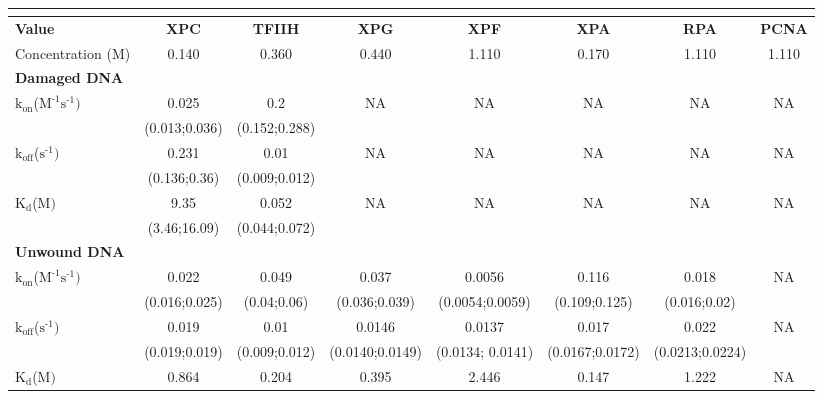 \begin{table}[H]
	
	\tiny
	\begin{tabular}{lccccccc}
		
		\multicolumn{8}{l}{} \\
		\hline
		\textbf{Value}    & \textbf{ XPC} & \textbf{TFIIH} & \textbf{XPG} & \textbf{XPF} & \textbf{XPA} & \textbf{RPA} & \textbf{PCNA}  \\
		\hline
		Concentration ({\textmu}M)                                                                        &0.140    & 0.360 & 0.440& 1.110& 0.170& 1.110& 1.110     \\
		\multicolumn{8}{l}{\textbf{Damaged DNA}} \\
		$\text{k}_{\text{on}}$({\textmu}$\text{M}^{\text{-1}}\text{s}^{\text{-1}})$& 0.025               & 0.2  & NA &NA&NA&NA&NA     \\
		& (0.013;0.036)     & (0.152;0.288)  &&&&&   \\
		$\text{k}_{\text{off}}$($\text{s}^{\text{-1}})$                                             & 0.231                & 0.01 & NA &NA&NA&NA&NA     \\
		& (0.136;0.36)     &(0.009;0.012)  &&&&&   \\
		$\text{K}_{\text{d}}$({\textmu}$\text{M})$                                                  & 9.35                & 0.052  & NA &NA&NA&NA&NA     \\
		& (3.46;16.09)     &(0.044;0.072)  &&&&&   \\
		\multicolumn{8}{l}{\textbf{Unwound DNA}} \\
		$\text{k}_{\text{on}}$({\textmu}$\text{M}^{\text{-1}}\text{s}^{\text{-1}})$    & 0.022                     & 0.049                   & 0.037                 &  0.0056             & 0.116                   &0.018                    & NA    \\
		& (0.016;0.025)     & (0.04;0.06)   					&(0.036;0.039) 		 & (0.0054;0.0059)&(0.109;0.125)    &(0.016;0.02)    &     \\
		$\text{k}_{\text{off}}$($\text{s}^{\text{-1}})$                                             & 0.019                     & 0.01                   & 0.0146               & 0.0137                & 0.017                   & 0.022                   &NA     \\
		& (0.019;0.019)     & (0.009;0.012)             & (0.0140;0.0149)&(0.0134; 0.0141)&(0.0167;0.0172)     &  (0.0213;0.0224)  &   \\
		$\text{K}_{\text{d}}$({\textmu}$\text{M})$                                                  & 0.864                     & 0.204                   & 0.395                 &2.446                 &0.147                    &1.222                    &NA     \\

\end{tabular}
\end{table}
